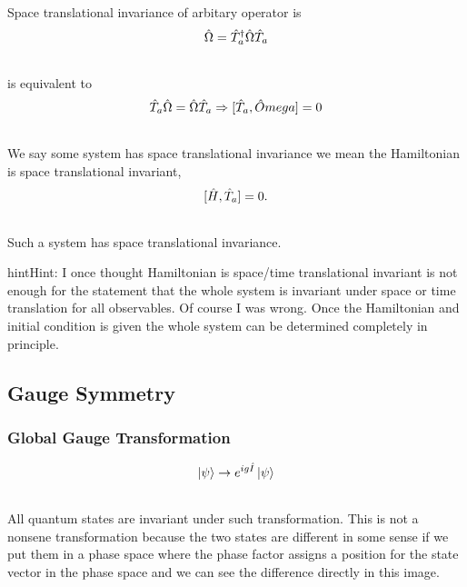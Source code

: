 \documentclass[letterpaper,10pt,english]{sphinxmanual}
\newcommand{\ket}[1]{\left| #1\right\rangle}
\begin{document}
Space translational invariance of arbitary operator is
\begin{gather}
\begin{split}\hat \Omega = \hat T_a^\dagger \hat \Omega \hat T_a\end{split}\notag\\\begin{split}\end{split}\notag
\end{gather}
is equivalent to
\begin{gather}
\begin{split}\hat T_a \hat \Omega = \hat \Omega \hat T_a \Rightarrow [\hat T_a, \hat Omega] = 0\end{split}\notag\\\begin{split}\end{split}\notag
\end{gather}
We say some system has space translational invariance we mean the Hamiltonian is space translational invariant,
\begin{gather}
\begin{split}[\hat H , \hat T_a ] = 0 .\end{split}\notag\\\begin{split}\end{split}\notag
\end{gather}
Such a system has space translational invariance.

\begin{notice}{hint}{Hint:}
I once thought Hamiltonian is space/time translational invariant is not enough for the statement that the whole system is invariant under space or time translation for all observables. Of course I was wrong. Once the Hamiltonian and initial condition is given the whole system can be determined completely in principle.
\end{notice}


\subsection{Gauge Symmetry}
\label{symmetries:gauge-symmetry}

\subsubsection{Global Gauge Transformation}
\label{symmetries:global-gauge-transformation}\begin{gather}
\begin{split}\ket{\psi} \rightarrow e^{i g \hat I} \ket{\psi}\end{split}\notag\\\begin{split}\end{split}\notag
\end{gather}
All quantum states are invariant under such transformation. This is not a nonsene transformation because the two states are different in some sense if we put them in a phase space where the phase factor assigns a position for the state vector in the phase space and we can see the difference directly in this image.
\end{document}
